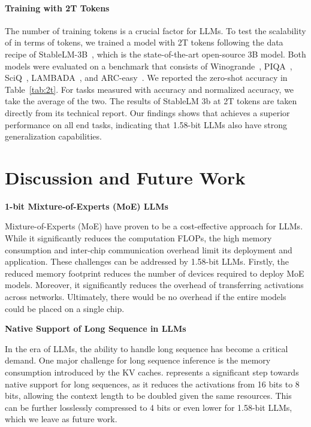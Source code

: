 \paragraph{Training with 2T Tokens}

The number of training tokens is a crucial factor for LLMs. To test the scalability of \our{} in terms of tokens, we trained a \our{} model with 2T tokens following the data recipe of StableLM-3B~\cite{StableLM-3B-4E1T}, which is the state-of-the-art open-source 3B model. Both models were evaluated on a benchmark that consists of Winogrande~\cite{winoGrande}, PIQA~\cite{piqa}, SciQ~\cite{sciq}, LAMBADA~\cite{lambada}, and ARC-easy~\cite{arc}. We reported the zero-shot accuracy in Table~\ref{tab:2t}. For tasks measured with accuracy and normalized accuracy, we take the average of the two. The results of StableLM 3b at 2T tokens are taken directly from its technical report. Our findings shows that \our{} achieves a superior performance on all end tasks, indicating that 1.58-bit LLMs also have strong generalization capabilities.






\section{Discussion and Future Work}

\textbf{1-bit Mixture-of-Experts (MoE) LLMs}

Mixture-of-Experts (MoE) have proven to be a cost-effective approach for LLMs. While it significantly reduces the computation FLOPs, the high memory consumption and inter-chip communication overhead limit its deployment and application. These challenges can be addressed by 1.58-bit LLMs. Firstly, the reduced memory footprint reduces the number of devices required to deploy MoE models. Moreover, it significantly reduces the overhead of transferring activations across networks. Ultimately, there would be no overhead if the entire models could be placed on a single chip.


\textbf{Native Support of Long Sequence in LLMs}

In the era of LLMs, the ability to handle long sequence has become a critical demand. One major challenge for long sequence inference is the memory consumption introduced by the KV caches. \our{} represents a significant step towards native support for long sequences, as it reduces the activations from 16 bits to 8 bits, allowing the context length to be doubled given the same resources. 
This can be further losslessly compressed to 4 bits or even lower for 1.58-bit LLMs, which we leave as future work.


